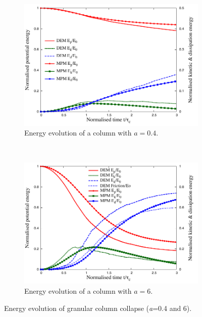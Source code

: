 \begin{figure}[tbhp]
\centering
\begin{subfigure}[b]{0.9\textwidth}
\includegraphics[width=\textwidth]{a04_energy}
\caption{Energy evolution of a column with $a=0.4$.}
\label{fig:a04_energy}
\end{subfigure}
\\
\begin{subfigure}[b]{0.9\textwidth}
\centering
\includegraphics[width=\textwidth]{a6_energy}
\caption{Energy evolution of a column with $a=6$.}
\label{fig:a6_energy}
\end{subfigure}
\caption{Energy evolution of granular column collapse (\textit{a}=0.4 and 6).}
\label{fig:column_energy}
\end{figure}

